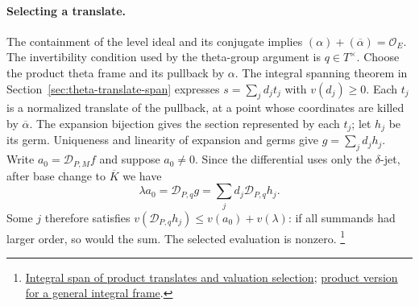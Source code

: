 \paragraph{Selecting a translate.}
The containment of the level ideal and its conjugate implies
\((\alpha)+(\overline\alpha)=\mathcal O_E\). The invertibility
condition used by the theta-group argument is \(q\in T^\times\).
Choose the product theta frame and its pullback by \(\alpha\).
The integral spanning theorem in Section~\ref{sec:theta-translate-span}
expresses \(s=\sum_j d_j t_j\) with \(v(d_j)\ge0\). Each \(t_j\)
is a normalized translate of the pullback, at a point whose
coordinates are killed by \(\overline\alpha\).
The expansion bijection gives the section represented by each
\(t_j\); let \(h_j\) be its germ. Uniqueness and linearity of
expansion and germs give \(g=\sum_j d_jh_j\).
Write \(a_0=\mathcal D_{P,M}f\) and suppose \(a_0\ne0\).
Since the differential uses only the \(\delta\)-jet, after base
change to \(\overline K\) we have
\[
     \lambda a_0=\mathcal D_{P,q}g
                 =\sum_j d_j\mathcal D_{P,q}h_j .
\]
Some \(j\) therefore satisfies
\(v(\mathcal D_{P,q}h_j)\le v(a_0)+v(\lambda)\): if all summands had
larger order, so would the sum. The selected evaluation is nonzero.
\footnote{\href{https://github.com/ChristianKudeba/alpoge-rh-verification/blob/alpoge-source-7cbf7a0c/src/Development/AbelianVarietyTheory/Proofs/JetHarmonics/ExistsTermLe.lean}{Integral span of product translates and valuation selection};
\href{https://github.com/ChristianKudeba/alpoge-rh-verification/blob/alpoge-source-7cbf7a0c/src/Development/AbelianVarietyTheory/Proofs/DivisorProofs/JetsOnCopiesAny.lean}{product version for a general integral frame}.}

